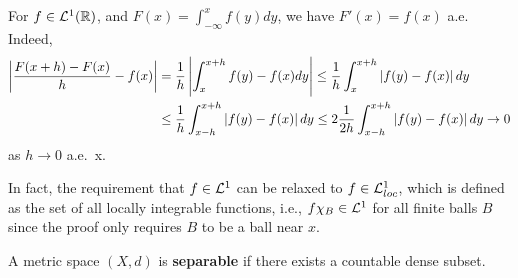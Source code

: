 \begin{remark}
    For $f\in\mathcal{L}^1(\mathbb{R})$, and $F(x) = \int_{-\infty}^x f(y)dy$, we 
    have $F'(x) = f(x)$ a.e. Indeed, 
    \begin{equation*}
        \begin{split}
            \left\lvert {\frac{F(x+h)-F(x)}{h}-f(x)} \right\rvert 
            &= \frac{1}{h}\left\lvert {\int_{x}^{x+h}f(y)-f(x)dy} \right\rvert 
            \leq \frac{1}{h}\int_{x}^{x+h}\left\lvert {f(y)-f(x)} \right\rvert dy \\ 
            &\leq \frac{1}{h}\int_{x-h}^{x+h}\left\lvert {f(y)-f(x)} \right\rvert dy 
            \leq 2\frac{1}{2h}\int_{x-h}^{x+h}\left\lvert {f(y)-f(x)} \right\rvert dy \to 0
        \end{split}
    \end{equation*}
    as $h\to 0$ a.e.\ x.
\end{remark}
\begin{remark}
    In fact, the requirement that $f\in\mathcal{L}^1$ can be relaxed to 
    $f\in\mathcal{L}^1_{loc}$, which is defined as the set of all locally 
    integrable functions, i.e., $f\chi_B\in\mathcal{L}^1$ for all finite 
    balls $B$ since the proof only requires $B$ to be a ball 
    near $x$. 
\end{remark} 

\begin{definition}
    A metric space $(X,d)$ is \textbf{separable} if there exists a countable 
    dense subset.
\end{definition}

